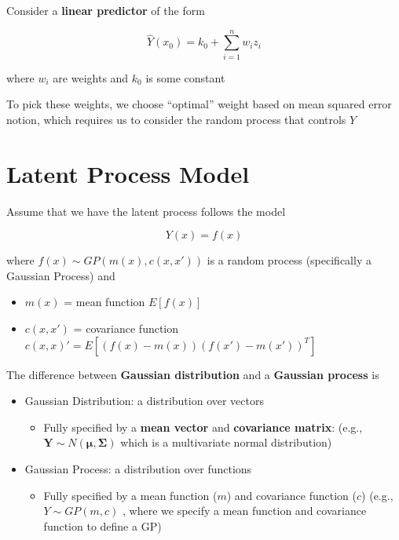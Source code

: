 \documentclass[
]{book}
\providecommand{\tightlist}{%
  \setlength{\itemsep}{0pt}\setlength{\parskip}{0pt}}
\begin{document}
Consider a \textbf{linear predictor} of the form

\[
\hat{Y}(x_0) = k_0 + \sum_{i=1}^n w_i z_i
\]

where \(w_i\) are weights and \(k_0\) is some constant

To pick these weights, we choose ``optimal'' weight based on mean squared error notion, which requires us to consider the random process that controls \(Y\)

\hypertarget{latent-process-model}{%
\section{Latent Process Model}\label{latent-process-model}}

Assume that we have the latent process follows the model

\[
Y(x) = f(x)
\]

where \(f(x) \sim GP (m(x), c(x,x'))\) is a random process (specifically a Gaussian Process) and

\begin{itemize}
\item
  \(m(x)\) = mean function \(E[f(x)]\)
\item
  \(c(x,x')\) = covariance function \(c(x,x)'= E[(f(x) - m(x)) (f(x') - m(x'))^T]\)
\end{itemize}

The difference between \textbf{Gaussian distribution} and a \textbf{Gaussian process} is

\begin{itemize}
\item
  Gaussian Distribution: a distribution over vectors

  \begin{itemize}
  \tightlist
  \item
    Fully specified by a \textbf{mean vector} and \textbf{covariance matrix}: (e.g., \(\mathbf{Y} \sim N(\mathbf{\mu}, \mathbf{\Sigma})\) which is a multivariate normal distribution)
  \end{itemize}
\item
  Gaussian Process: a distribution over functions

  \begin{itemize}
  \tightlist
  \item
    Fully specified by a mean function (\(m\)) and covariance function (\(c\)) (e.g., \(Y \sim GP(m,c)\) , where we specify a mean function and covariance function to define a GP)
  \end{itemize}
\end{itemize}
\end{document}

